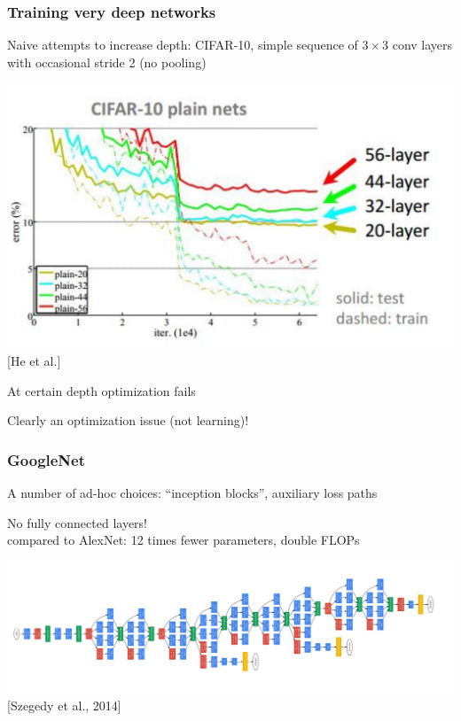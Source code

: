 \documentclass[xcolor=dvipsnames]{beamer}
\begin{document}
\begin{frame}
  \frametitle{Training very deep networks}
  \bi
\item Naive attempts to increase depth: CIFAR-10, simple sequence of
  $3\times3$ conv layers with occasional stride 2 (no pooling)

\includegraphics[width=.7\textwidth]{he-plaintrain}\\
{[He et al.]}
\item At certain depth optimization fails
\item Clearly an optimization issue (not learning)!
\ei
\end{frame}

\begin{frame}
  \frametitle{GoogleNet}
  \bi
\item A number of ad-hoc choices: ``inception blocks'', auxiliary loss
  paths
\item No fully connected layers!\\
compared to AlexNet: 12 times fewer parameters, double FLOPs
\ei

\includegraphics[width=.95\textwidth]{googlenet-2014}\\
{[Szegedy et al., 2014]}

\end{frame}
\end{document}

